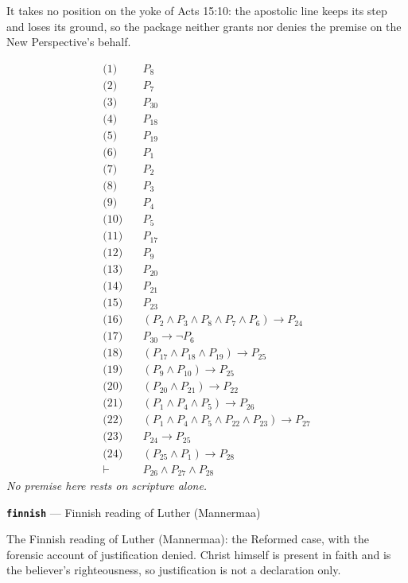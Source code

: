 \documentclass[11pt]{article}
\begin{document}
It takes no position on the yoke of Acts 15:10: the apostolic line keeps its step and loses its ground, so the package neither grants nor denies the premise on the New Perspective's behalf.

\begin{align*}
  \text{(1)} \quad & P_{8} \\
  \text{(2)} \quad & P_{7} \\
  \text{(3)} \quad & P_{30} \\
  \text{(4)} \quad & P_{18} \\
  \text{(5)} \quad & P_{19} \\
  \text{(6)} \quad & P_{1} \\
  \text{(7)} \quad & P_{2} \\
  \text{(8)} \quad & P_{3} \\
  \text{(9)} \quad & P_{4} \\
  \text{(10)} \quad & P_{5} \\
  \text{(11)} \quad & P_{17} \\
  \text{(12)} \quad & P_{9} \\
  \text{(13)} \quad & P_{20} \\
  \text{(14)} \quad & P_{21} \\
  \text{(15)} \quad & P_{23} \\
  \text{(16)} \quad & (P_{2} \land P_{3} \land P_{8} \land P_{7} \land P_{6}) \rightarrow P_{24} \\
  \text{(17)} \quad & P_{30} \rightarrow \lnot P_{6} \\
  \text{(18)} \quad & (P_{17} \land P_{18} \land P_{19}) \rightarrow P_{25} \\
  \text{(19)} \quad & (P_{9} \land P_{10}) \rightarrow P_{25} \\
  \text{(20)} \quad & (P_{20} \land P_{21}) \rightarrow P_{22} \\
  \text{(21)} \quad & (P_{1} \land P_{4} \land P_{5}) \rightarrow P_{26} \\
  \text{(22)} \quad & (P_{1} \land P_{4} \land P_{5} \land P_{22} \land P_{23}) \rightarrow P_{27} \\
  \text{(23)} \quad & P_{24} \rightarrow P_{25} \\
  \text{(24)} \quad & (P_{25} \land P_{1}) \rightarrow P_{28} \\
  \vdash \quad & P_{26} \land P_{27} \land P_{28}
\end{align*}
\emph{No premise here rests on scripture alone.}
\par\medskip\noindent\textbf{\texttt{finnish}} --- Finnish reading of Luther (Mannermaa)\par\nobreak\noindent
The Finnish reading of Luther (Mannermaa): the Reformed case, with the forensic account of justification denied. Christ himself is present in faith and is the believer's righteousness, so justification is not a declaration only.
\end{document}
